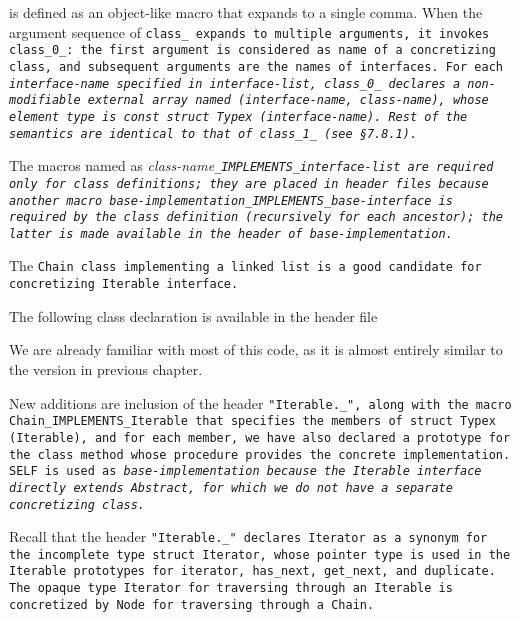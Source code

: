 
 is defined as an object-like macro that expands to a single comma.
When the argument sequence of \tt{class_} expands to multiple arguments,
it invokes \tt{class_0_}: the first argument is considered as name of a
concretizing class, and subsequent arguments are the names of interfaces.
For each \it{interface-name} specified in \it{interface-list},
\tt{class_0_} declares a non-modifiable external array named
\tt{(}\it{interface-name}\tt{,} \it{class-name}\tt{)},
whose element type is \tt{const struct Typex (}\it{interface-name}\tt{)}.
Rest of the semantics are identical to that of \tt{class_1_} (see \S 7.8.1).

\enlargethispage*{\baselineskip}
\enlargethispage*{\baselineskip}
\enlargethispage*{\baselineskip}

\note The macros named as \it{class-name}\tt{_IMPLEMENTS_}\it{interface-list}
are required only for class definitions; they are placed in header files because
another macro \it{base-implementation}\tt{_IMPLEMENTS_}\it{base-interface}
is required by the class definition (recursively for each ancestor);
the latter is made available in the header of \it{base-implementation}.

\example The \tt{Chain} class implementing a linked list is
a good candidate for concretizing \tt{Iterable} interface.

The following class declaration is available in the header file

We are already familiar with most of this code,
as it is almost entirely similar to the version in previous chapter.

\pagebreak

New additions are inclusion of the header \tt{"Iterable._"},
along with the macro \tt{Chain_IMPLEMENTS_Iterable} that specifies
the members of \tt{struct Typex (Iterable)}, and for each member,
we have also declared a prototype for the class method
whose procedure provides the concrete implementation.
\tt{SELF} is used as \it{base-implementation} because the
\tt{Iterable} interface directly extends \tt{Abstract},
for which we do not have a separate concretizing class.

Recall that the header \tt{"Iterable._"} declares \tt{Iterator}
as a synonym for the incomplete type \tt{struct Iterator},
whose pointer type is used in the \tt{Iterable} prototypes for
\tt{iterator}, \tt{has_next}, \tt{get_next}, and \tt{duplicate}.
The opaque type \tt{Iterator} for traversing through an \tt{Iterable}
is concretized by \tt{Node} for traversing through a \tt{Chain}.
